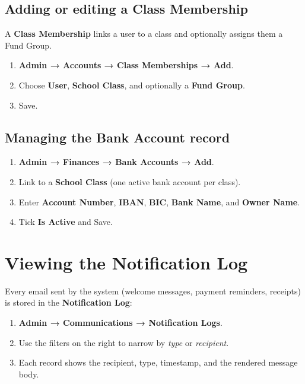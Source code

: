 \documentclass[a4paper,11pt]{article}
\begin{document}
\subsection{Adding or editing a Class Membership}

A \textbf{Class Membership} links a user to a class and optionally
assigns them a Fund Group.

\begin{enumerate}[noitemsep]
    \item \textbf{Admin → Accounts → Class Memberships → Add}.
    \item Choose \textbf{User}, \textbf{School Class}, and optionally a
          \textbf{Fund Group}.
    \item Save.
\end{enumerate}

\subsection{Managing the Bank Account record}

\begin{enumerate}[noitemsep]
    \item \textbf{Admin → Finances → Bank Accounts → Add}.
    \item Link to a \textbf{School Class} (one active bank account per class).
    \item Enter \textbf{Account Number}, \textbf{IBAN}, \textbf{BIC},
          \textbf{Bank Name}, and \textbf{Owner Name}.
    \item Tick \textbf{Is Active} and Save.
\end{enumerate}

\section{Viewing the Notification Log}

Every email sent by the system (welcome messages, payment reminders,
receipts) is stored in the \textbf{Notification Log}:

\begin{enumerate}[noitemsep]
    \item \textbf{Admin → Communications → Notification Logs}.
    \item Use the filters on the right to narrow by \textit{type} or
          \textit{recipient}.
    \item Each record shows the recipient, type, timestamp, and the
          rendered message body.
\end{enumerate}
\end{document}
